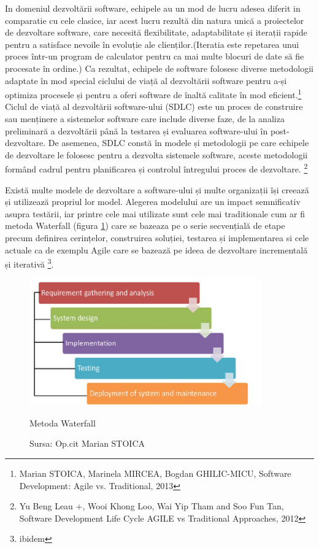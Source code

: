 \documentclass[a4paper, 12pt]{article}
\begin{document}
		\quad\quad In domeniul dezvoltării software, echipele au un mod de lucru adesea diferit in comparatie cu cele clasice, iar acest lucru rezultă din natura unică a proiectelor de dezvoltare software, care necesită flexibilitate, adaptabilitate și iterații rapide pentru a satisface nevoile în evoluție ale clienților.(Iteratia este  repetarea unui proces într-un program de calculator pentru ca mai multe blocuri de date să fie procesate în ordine.) Ca rezultat, echipele de software folosesc diverse metodologii adaptate în mod special ciclului de viață al dezvoltării software pentru a-și optimiza procesele și pentru a oferi software de înaltă calitate în mod eficient.\footnote{ Marian STOICA, Marinela MIRCEA, Bogdan GHILIC-MICU, Software Development: Agile vs. Traditional, 2013} Ciclul de viață al dezvoltării software-ului (SDLC) este un proces de construire sau menținere a sistemelor software care  include diverse faze, de la analiza preliminară a dezvoltării până la testarea și evaluarea software-ului în post-dezvoltare. De asemenea, SDLC constă în modele și metodologii pe care echipele de dezvoltare le folosesc pentru a dezvolta sistemele software, aceste metodologii formând cadrul pentru planificarea și controlul întregului proces de dezvoltare. \footnote{Yu Beng Leau +, Wooi Khong Loo, Wai Yip Tham and Soo Fun Tan, Software Development Life Cycle AGILE vs Traditional Approaches, 2012}

	\quad\quad Există multe modele de dezvoltare a software-ului și multe organizații își creează și utilizează propriul lor model. Alegerea modelului are un impact semnificativ asupra testării, iar printre cele mai utilizate sunt cele mai traditionale cum ar fi metoda Waterfall (figura \ref{fig:one}) care se bazeaza pe o serie secvențială de etape precum definirea cerințelor, construirea soluției, testarea și implementarea si cele actuale ca de exemplu Agile care se bazează pe ideea de dezvoltare incrementală și iterativă \footnote{ibidem}.

\begin{figure}[!htb]
			\centering
			\includegraphics[width=10cm, height=5 cm]{"figures/waterfall.png"}
			\caption {Metoda Waterfall}\label{fig:one}
			\caption*{Sursa: Op.cit Marian STOICA }
		\end{figure}
\end{document}
